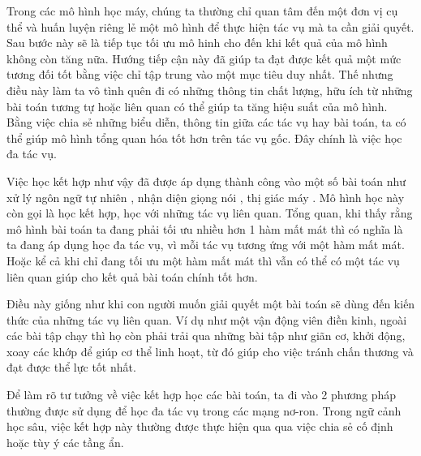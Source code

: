 \documentclass[../main.tex]{subfiles}
\begin{document}
Trong các mô hình học máy, chúng ta thường chỉ quan tâm đến một đơn vị cụ thể và huấn luyện riêng lẻ một mô hình để thực hiện tác vụ mà ta cần giải quyết. Sau bước này sẽ là tiếp tục tối ưu mô hinh cho đến khi kết quả của mô hình không còn tăng nữa. Hướng tiếp cận này đã giúp ta đạt được kết quả một mức tương đối tốt bằng việc chỉ tập trung vào một mục tiêu duy nhất. Thế nhưng điều này làm ta vô tình quên đi có những thông tin chất lượng, hữu ích từ những bài toán tương tự hoặc liên quan có thể giúp ta tăng hiệu suất của mô hình. Bằng việc chia sẻ những biểu diễn, thông tin giữa các tác vụ hay bài toán, ta có thể giúp mô hình tổng quan hóa tốt hơn trên tác vụ gốc. Đây chính là việc học đa tác vụ. 

Việc học kết hợp như vậy đã được áp dụng thành công vào một số bài toán như xử lý ngôn ngữ tự nhiên \cite{collobert2008unified}, nhận diện giọng nói \cite{deng2013new}, thị giác máy \cite{he2015proceedings}. Mô hình học này còn gọi là học kết hợp, học với những tác vụ liên quan. Tổng quan, khi thấy rằng mô hình bài toán ta đang phải tối ưu nhiều hơn 1 hàm mất mát thì có nghĩa là ta đang áp dụng học đa tác vụ, vì mỗi tác vụ tương ứng với một hàm mất mát. Hoặc kể cả khi chỉ đang tối ưu một hàm mất mát thì vẫn có thể có một tác vụ liên quan giúp cho kết quả bài toán chính tốt hơn. 

Điều này giống như khi con người muốn giải quyết một bài toán sẽ dùng đến kiến thức của những tác vụ liên quan. Ví dụ như một vận động viên điền kinh, ngoài các bài tập chạy thì họ còn phải trải qua những bài tập như giãn cơ, khởi động, xoay các khớp để giúp cơ thể linh hoạt, từ đó giúp cho việc tránh chấn thương và đạt được thể lực tốt nhất. 

Để làm rõ tư tưởng về việc kết hợp học các bài toán, ta đi vào 2 phương pháp thường được sử dụng để học đa tác vụ trong các mạng nơ-ron. Trong ngữ cảnh học sâu, việc kết hợp này thường được thực hiện qua qua việc chia sẻ cố định hoặc tùy ý các tầng ẩn. 
\end{document}

